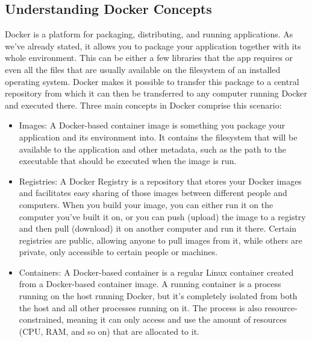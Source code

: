 \subsection{Understanding Docker Concepts}
Docker is a platform for packaging, distributing, and running applications. As we’ve already stated, it allows you to package your application together with its whole environment. This can be either a few libraries that the app requires or even all the files that are usually available on the filesystem of an installed operating system. Docker makes it possible to transfer this package to a central repository from which it can then be transferred to any computer running Docker and executed there.
Three main concepts in Docker comprise this scenario:

\begin{itemize}
	\item Images: A Docker-based container image is something you package your application and its environment into. It contains the filesystem that will be available to the application and other metadata, such as the path to the executable that should be executed when the image is run.
	\item Registries: A Docker Registry is a repository that stores your Docker images and facilitates easy sharing of those images between different people and computers. When you build your image, you can either run it on the computer you’ve built it on, or you can push (upload) the image to a registry and then pull (download) it on another computer and run it there. Certain registries are public, allowing anyone to pull images from it, while others are private, only accessible to certain people or machines.
	\item Containers: A Docker-based container is a regular Linux container created from a Docker-based container image. A running container is a process running on the host running Docker, but it’s completely isolated from both the host and all other processes running on it. The process is also resource-constrained, meaning it can only access and use the amount of resources (CPU, RAM, and so on) that are allocated to it.
\end{itemize}

